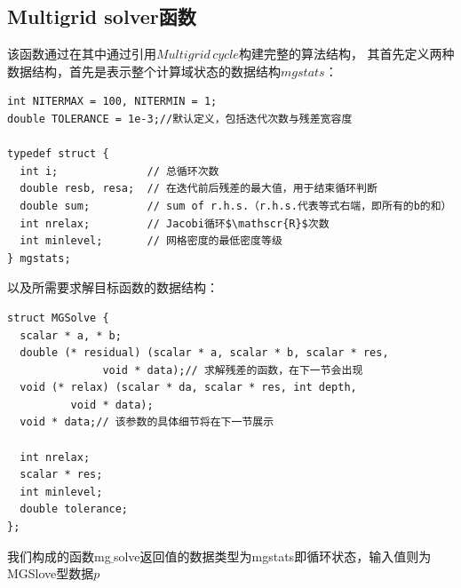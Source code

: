 \documentclass[lang=cn,11pt,a4paper]{elegantpaper}
\begin{document}
\subsection{Multigrid solver函数}\label{sec:multisolver}
该函数通过在其中通过引用$Multigrid\,cycle$构建完整的算法结构，
其首先定义两种数据结构，首先是表示整个计算域状态的数据结构$mgstats$：
\begin{verbatim}
int NITERMAX = 100, NITERMIN = 1;
double TOLERANCE = 1e-3;//默认定义，包括迭代次数与残差宽容度

typedef struct {
  int i;              // 总循环次数
  double resb, resa;  // 在迭代前后残差的最大值，用于结束循环判断
  double sum;         // sum of r.h.s.（r.h.s.代表等式右端，即所有的b的和）
  int nrelax;         // Jacobi循环$\mathscr{R}$次数
  int minlevel;       // 网格密度的最低密度等级
} mgstats;
\end{verbatim}
以及所需要求解目标函数的数据结构：
\begin{verbatim}
struct MGSolve {
  scalar * a, * b;
  double (* residual) (scalar * a, scalar * b, scalar * res,
               void * data);// 求解残差的函数，在下一节会出现
  void (* relax) (scalar * da, scalar * res, int depth, 
          void * data);
  void * data;// 该参数的具体细节将在下一节展示
  
  int nrelax;
  scalar * res;
  int minlevel;
  double tolerance;
};
\end{verbatim}
我们构成的函数mg$\underline{~}$solve返回值的数据类型为mgstats即循环状态，输入值则为MGSlove型数据$p$
\end{document}
